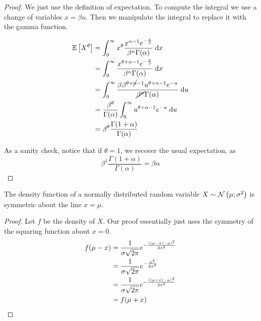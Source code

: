 \documentclass[11pt]{article}
\begin{document}
\begin{proof}
    We just use the definition of expectation.
    To compute the integral we use a change of variables $x = \beta u$.
    Then we manipulate the integral to replace it with the gamma function.

    \begin{align*}
        \operatorname{\mathbb{E}}{\left[X^\theta\right]}
        &= \int^{\infty}_0 {
            x^\theta
            \frac{
                x^{\alpha - 1} e^{-\frac{x}{\beta}}
            }{
                \beta^\alpha \Gamma(\alpha)
            }
        }
        \;\mathrm{d} x
        \\
        &= \int^{\infty}_0 {
            \frac{
                x^{\theta + \alpha - 1} e^{-\frac{x}{\beta}}
            }{
                \beta^\alpha \Gamma(\alpha)
            }
        }
        \;\mathrm{d} x
        \\
        &= \int^{\infty}_0 {
            \frac{
                \beta \beta^{\theta + \cancel{\alpha} - 1}
                u^{\theta + \alpha - 1}
                e^{-u}
            }{
                \cancel{\beta^\alpha} \Gamma(\alpha)
            }
        }
        \;\mathrm{d} u
        \\
        &= \frac{\beta^\theta}{\Gamma(\alpha)}
        \int^{\infty}_0{
            u^{\theta + \alpha - 1} e^{-u}
        }
        \;\mathrm{d} u
        \\
        &= \beta^\theta \frac{\Gamma(1 + \alpha)}{\Gamma(\alpha)}
    \end{align*}

    As a sanity check, notice that if $\theta = 1$, we recover the usual
    expectation, as
    \begin{equation*}
        \beta^1 \frac{\Gamma(1 + \alpha)}{\Gamma(\alpha)}
        =
        \beta \alpha
    \end{equation*}
\end{proof}


\begin{prop}
    The density function of a normally distributed random variable
    $X \sim \operatorname{\mathcal{N}}\left(\mu;\sigma^2\right)$ is symmetric about the line $x = \mu$.
\end{prop}

\begin{proof}
    Let $f$ be the density of $X$. Our proof essentially just uses the symmetry
    of the squaring function about $x = 0$.
    \newcommand{\bleh}[1]{
        \frac{1}{\sigma\sqrt{2\pi}}
        e^{-\frac{#1}{2\sigma^2}}
    }
    \begin{align*}
        f(\mu - x)
        &= \bleh{\parens{(\mu - x) - \mu}^2} \\
        &= \bleh{x^2} \\
        &= \bleh{\parens{(\mu + x) - \mu}^2} \\
        &= f(\mu + x)
    \end{align*}
\end{proof}
\end{document}
